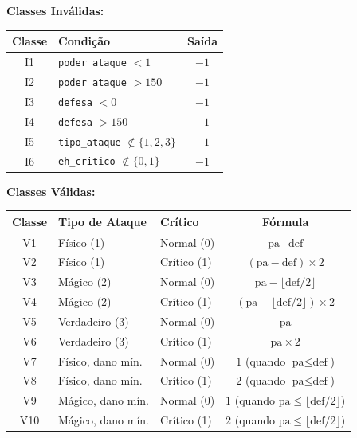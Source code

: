 \documentclass[12pt,a4paper]{article}
\begin{document}
\begin{tcolorbox}[colback=red!5, colframe=red!40, title=\textbf{Particionamento de Equivalência}, fonttitle=\small]

\textbf{Classes Inválidas:}

\begin{center}
\begin{tabular}{clc}
\toprule
\textbf{Classe} & \textbf{Condição} & \textbf{Saída} \\
\midrule
I1 & \texttt{poder\_ataque} $< 1$ & $-1$ \\
I2 & \texttt{poder\_ataque} $> 150$ & $-1$ \\
I3 & \texttt{defesa} $< 0$ & $-1$ \\
I4 & \texttt{defesa} $> 150$ & $-1$ \\
I5 & \texttt{tipo\_ataque} $\notin \{1,2,3\}$ & $-1$ \\
I6 & \texttt{eh\_critico} $\notin \{0,1\}$ & $-1$ \\
\bottomrule
\end{tabular}
\end{center}

\vspace{0.15in}
\textbf{Classes Válidas:}

\begin{center}
\begin{tabular}{cllc}
\toprule
\textbf{Classe} & \textbf{Tipo de Ataque} & \textbf{Crítico} & \textbf{Fórmula} \\
\midrule
V1 & Físico (1) & Normal (0) & $\text{pa} - \text{def}$ \\
V2 & Físico (1) & Crítico (1) & $(\text{pa} - \text{def}) \times 2$ \\
V3 & Mágico (2) & Normal (0) & $\text{pa} - \lfloor\text{def}/2\rfloor$ \\
V4 & Mágico (2) & Crítico (1) & $(\text{pa} - \lfloor\text{def}/2\rfloor) \times 2$ \\
V5 & Verdadeiro (3) & Normal (0) & $\text{pa}$ \\
V6 & Verdadeiro (3) & Crítico (1) & $\text{pa} \times 2$ \\
\midrule
V7 & Físico, dano mín. & Normal (0) & $1$ \quad (quando $\text{pa} \leq \text{def}$) \\
V8 & Físico, dano mín. & Crítico (1) & $2$ \quad (quando $\text{pa} \leq \text{def}$) \\
V9 & Mágico, dano mín. & Normal (0) & $1$ \quad (quando $\text{pa} \leq \lfloor\text{def}/2\rfloor$) \\
V10 & Mágico, dano mín. & Crítico (1) & $2$ \quad (quando $\text{pa} \leq \lfloor\text{def}/2\rfloor$) \\
\bottomrule
\end{tabular}
\end{center}

\end{tcolorbox}
\end{document}
